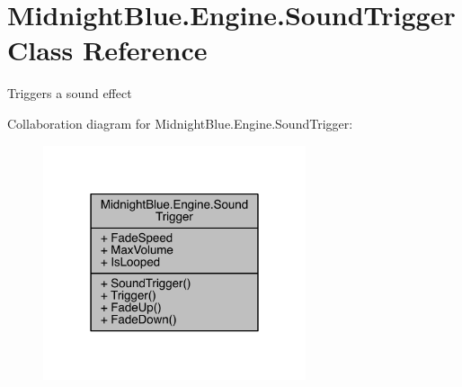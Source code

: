 \hypertarget{class_midnight_blue_1_1_engine_1_1_sound_trigger}{}\section{Midnight\+Blue.\+Engine.\+Sound\+Trigger Class Reference}
\label{class_midnight_blue_1_1_engine_1_1_sound_trigger}


Triggers a sound effect  




Collaboration diagram for Midnight\+Blue.\+Engine.\+Sound\+Trigger\+:
\nopagebreak
\begin{figure}[H]
\begin{center}
\leavevmode
\includegraphics[width=219pt]{class_midnight_blue_1_1_engine_1_1_sound_trigger__coll__graph}
\end{center}
\end{figure}
